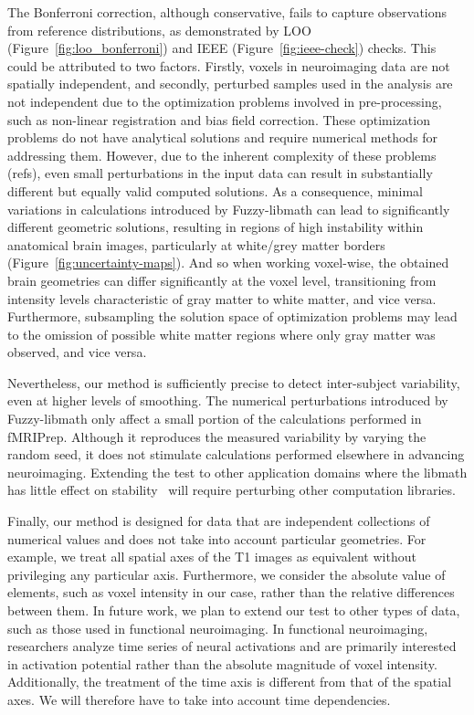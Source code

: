 \documentclass{article}
\newcommand{\fmriprep}{fMRIPrep\xspace}
\begin{document}
The Bonferroni correction, although conservative, fails to capture observations from reference distributions, as demonstrated by LOO (Figure~\ref{fig:loo_bonferroni}) and IEEE (Figure~\ref{fig:ieee-check}) checks. This could be attributed to two factors. Firstly, voxels in neuroimaging data are not spatially independent, and secondly, perturbed samples used in the analysis are not independent due to the optimization problems involved in pre-processing, such as non-linear registration and bias field correction. These optimization problems do not have analytical solutions and require numerical methods for addressing them. However, due to the inherent complexity of these problems (refs), even small perturbations in the input data can result in substantially different but equally valid computed solutions. As a consequence, minimal variations in calculations introduced by Fuzzy-libmath can lead to significantly different geometric solutions, resulting in regions of high instability within anatomical brain images, particularly at white/grey matter borders (Figure~\ref{fig:uncertainty-maps}). And so when working voxel-wise, the obtained brain geometries can differ significantly at the voxel level, transitioning from intensity levels characteristic of gray matter to white matter, and vice versa. Furthermore, subsampling the solution space of optimization problems may lead to the omission of possible white matter regions where only gray matter was observed, and vice versa.

Nevertheless, our method is sufficiently precise to detect inter-subject variability, even at higher levels of smoothing. The numerical perturbations introduced by Fuzzy-libmath only affect a small portion of the calculations performed in \fmriprep. Although it reproduces the measured variability by varying the random seed, it does not stimulate calculations performed elsewhere in advancing neuroimaging. Extending the test to other application domains where the libmath has little effect on stability~\cite{pepe2022numerical} will require perturbing other computation libraries.

Finally, our method is designed for data that are independent collections of numerical values and does not take into account particular geometries. For example, we treat all spatial axes of the T1 images as equivalent without privileging any particular axis. Furthermore, we consider the absolute value of elements, such as voxel intensity in our case, rather than the relative differences between them. In future work, we plan to extend our test to other types of data, such as those used in functional neuroimaging. In functional neuroimaging, researchers analyze time series of neural activations and are primarily interested in activation potential rather than the absolute magnitude of voxel intensity. Additionally, the treatment of the time axis is different from that of the spatial axes. We will therefore have to take into account time dependencies.
\end{document}

